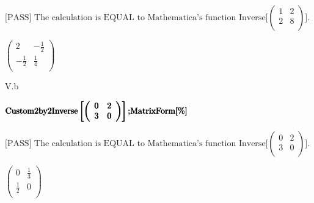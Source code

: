 \documentclass{article}
\begin{document}
\begin{doublespace}
\\
\\
\\
\pmb{];}\\
\pmb{];}\\
\\
\)
\end{doublespace}

\noindent\(\text{[PASS] The calculation is EQUAL to Mathematica's function Inverse[}\left(
\begin{array}{cc}
 1 & 2 \\
 2 & 8 \\
\end{array}
\right)\text{].}\)

\begin{doublespace}
\noindent\(\left(
\begin{array}{cc}
 2 & -\frac{1}{2} \\
 -\frac{1}{2} & \frac{1}{4} \\
\end{array}
\right)\)
\end{doublespace}

V.b

\begin{doublespace}
\noindent\(\pmb{\text{Custom2by2Inverse}\left[\left(
\begin{array}{cc}
 0 & 2 \\
 3 & 0 \\
\end{array}
\right)\right];}\\
\pmb{\text{MatrixForm}[\%]}\)
\end{doublespace}

\noindent\(\text{[PASS] The calculation is EQUAL to Mathematica's function Inverse[}\left(
\begin{array}{cc}
 0 & 2 \\
 3 & 0 \\
\end{array}
\right)\text{].}\)

\begin{doublespace}
\noindent\(\left(
\begin{array}{cc}
 0 & \frac{1}{3} \\
 \frac{1}{2} & 0 \\
\end{array}
\right)\)
\end{doublespace}
\end{document}
